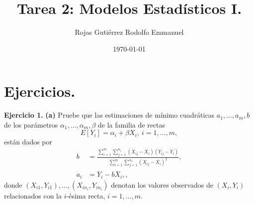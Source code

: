 \documentclass[10.5pt,notitlepage]{article}
\title{Tarea 2: Modelos Estadísticos I.}
\author{Rojas Gutiérrez Rodolfo Emmanuel}
\date{\today}
\begin{document}
\maketitle

\section{Ejercicios.}


\noindent \textbf{Ejercicio 1.} \textbf{(a)} Pruebe que las estimaciones de mínimo cuadráticas \(a_1,\hdots,a_m,b\) de los parámetros \(\alpha_1,\hdots,\alpha_m,\beta\) de la familia de rectas 
\[
E[Y_i] = \alpha_i+\beta X_i, \ i = 1,\hdots,m,
\]
están dados por 
\begin{align}
    b &= \frac{\sum_{i = 1}^{m}\sum_{j=1}^{n_i}(X_{ij} - \overline{X_i})(Y_{ij} - \overline{Y_i})}{\sum_{i = 1}^{m}\sum_{j=1}^{n_i}(X_{ij} - \overline{X_i})^2}, \label{1.-1}\\ 
    a_i &= \overline{Y}_i - b \overline{X}_i, \label{1.0},
\end{align}
donde \((X_{i1},Y_{i1}),\hdots,(X_{in_i},Y_{in_i})\) denotan los valores observados de \((X_i,Y_i)\) relacionados con la \(i\)-ésima recta, \(i = 1,\hdots, m\).\\
\end{document}
